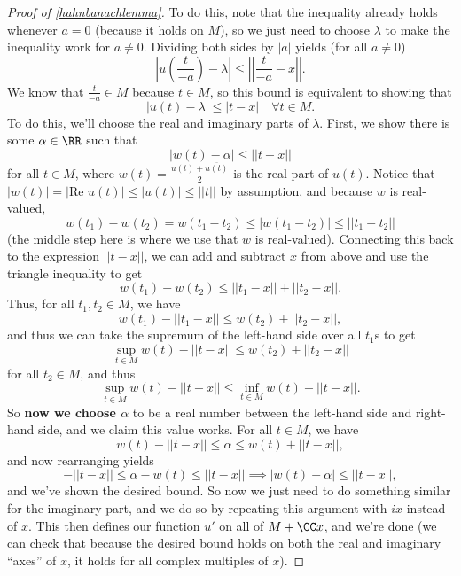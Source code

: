 \begin{proof}[Proof of \cref{hahnbanachlemma}]
To do this, note that the inequality already holds whenever $a = 0$ (because it holds on $M$), so we just need to choose $\lambda$ to make the inequality work for $a \ne 0$. Dividing both sides by $|a|$ yields (for all $a \ne 0$)
\[
    \left|u\left(\frac{t}{-a}\right) - \lambda\right| \le \left|\left|\frac{t}{-a} - x\right|\right|.
\]
We know that $\frac{t}{-a} \in M$ because $t \in M$, so this bound is equivalent to showing that 
\[
    |u(t) - \lambda| \le |t - x| \quad \forall t \in M.
\]
To do this, we'll choose the real and imaginary parts of $\lambda$. First, we show there is some $\alpha \in \RR$ such that 
\[
    |w(t) - \alpha| \le ||t-x||
\]
for all $t \in M$, where $w(t) = \frac{u(t) + \overline{u(t)}}{2}$ is the real part of $u(t)$.  Notice that $|w(t)| = |\text{Re }u(t)| \le |u(t)| \le ||t||$ by assumption, and because $w$ is real-valued, 
\[
    w(t_1) - w(t_2) = w(t_1 - t_2) \le |w(t_1 - t_2)| \le ||t_1 - t_2||
\]
(the middle step here is where we use that $w$ is real-valued). Connecting this back to the expression $||t-x||$, we can add and subtract $x$ from above and use the triangle inequality to get
\[
    w(t_1) - w(t_2) \le ||t_1 - x|| + ||t_2 - x||.
\]
Thus, for all $t_1, t_2 \in M$, we have
\[
    w(t_1) - ||t_1 - x|| \le w(t_2) + ||t_2 - x||,
\]
and thus we can take the supremum of the left-hand side over all $t_1$s to get 
\[
    \sup_{t \in M} w(t) - ||t-x|| \le w(t_2) + ||t_2 - x||
\]
for all $t_2 \in M$, and thus
\[
    \sup_{t \in M} w(t) - ||t-x|| \le \inf_{t \in M} w(t) + ||t - x||.
\]
So \textbf{now we choose $\alpha$} to be a real number between the left-hand side and right-hand side, and we claim this value works. For all $t \in M$, we have
\[
    w(t) - ||t-x|| \le \alpha \le w(t) + ||t-x||,
\]
and now rearranging yields
\[
    -||t-x|| \le \alpha - w(t) \le ||t-x|| \implies |w(t) - \alpha| \le ||t-x||,
\]
and we've shown the desired bound. So now we just need to do something similar for the imaginary part, and we do so by repeating this argument with $ix$ instead of $x$. This then defines our function $u'$ on all of $M + \CC x$, and we're done (we can check that because the desired bound holds on both the real and imaginary ``axes'' of $x$, it holds for all complex multiples of $x$). 
\end{proof}


